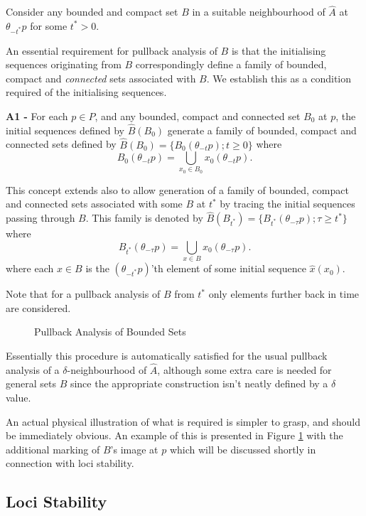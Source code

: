 Consider any bounded and compact set $B$ in a suitable neighbourhood of
$\hat{A}$ at $\theta_{-t^*}p$ for some $t^*>0$.

An essential requirement for pullback analysis of $B$ is that the
initialising sequences originating from $B$ correspondingly define a family of
bounded, compact and \textit{connected} sets associated with $B$. We establish
this as a condition required of the initialising sequences.

\textbf{A1 - } For each $p \in P$, and any
bounded, compact and connected set $B_0$ at $p$, the initial
sequences defined by $\hat{B}(B_0)$ generate a family of bounded, compact and
connected sets defined by $\hat{B}(B_0) = \{ B_0(\theta_{-t}p) ; t \geq 0 \}$
where
\[ B_0(\theta_{-t}p) = \bigcup_{x_0 \in B_0} x_0(\theta_{-t}p). \]

This concept extends also to allow generation of a family of bounded, compact
and connected sets associated with some $B$ at $t^*$ by tracing the initial
sequences passing through $B$. This family is denoted by $\hat{B}(B_{t^*}) =
\{B_{t^*}(\theta_{- \tau} p); \tau \geq t^* \}$ where
\[ B_{t^*}(\theta_{- \tau} p) = \bigcup_{x \in B} x_0(\theta_{- \tau}p). \]
where each $x \in B$ is the $(\theta_{-t^*}p)$'th element of some initial
sequence $\hat{x}(x_0)$.

Note that for a pullback analysis of $B$ from $t^*$ only elements
further back in time are considered.

\begin{figure}[htb]
\begin{center}
 \caption{Pullback Analysis of Bounded Sets}
\protect\label{loci10}
\end{center}
\end{figure}

Essentially this procedure is automatically satisfied for the usual
pullback analysis of a $\delta$-neighbourhood of $\hat{A}$, although some extra
care is needed for general sets $B$ since the appropriate construction
isn't neatly defined by a $\delta$ value.

An actual physical illustration of what is required is simpler to grasp, and
should be immediately obvious. An example of this is presented in Figure
\ref{loci10} with the additional marking of $B$'s image at $p$ which will be
discussed shortly in connection with loci stability.

\subsection{Loci Stability}

